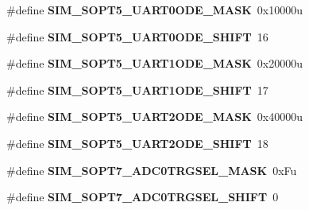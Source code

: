 \begin{DoxyCompactItemize}
\item 
\hypertarget{group___s_i_m___register___masks_ga85d9af0e8b110779992162a6820b5358}{}\#define {\bfseries S\+I\+M\+\_\+\+S\+O\+P\+T5\+\_\+\+U\+A\+R\+T0\+O\+D\+E\+\_\+\+M\+A\+S\+K}~0x10000u\label{group___s_i_m___register___masks_ga85d9af0e8b110779992162a6820b5358}

\item 
\hypertarget{group___s_i_m___register___masks_gaa972dcd4d7e6d7a72e9da197afd19f03}{}\#define {\bfseries S\+I\+M\+\_\+\+S\+O\+P\+T5\+\_\+\+U\+A\+R\+T0\+O\+D\+E\+\_\+\+S\+H\+I\+F\+T}~16\label{group___s_i_m___register___masks_gaa972dcd4d7e6d7a72e9da197afd19f03}

\item 
\hypertarget{group___s_i_m___register___masks_ga8b6934ad333eab03eb0884605ae53383}{}\#define {\bfseries S\+I\+M\+\_\+\+S\+O\+P\+T5\+\_\+\+U\+A\+R\+T1\+O\+D\+E\+\_\+\+M\+A\+S\+K}~0x20000u\label{group___s_i_m___register___masks_ga8b6934ad333eab03eb0884605ae53383}

\item 
\hypertarget{group___s_i_m___register___masks_gaefef8a191a226bed4aaa950f3ea66e3e}{}\#define {\bfseries S\+I\+M\+\_\+\+S\+O\+P\+T5\+\_\+\+U\+A\+R\+T1\+O\+D\+E\+\_\+\+S\+H\+I\+F\+T}~17\label{group___s_i_m___register___masks_gaefef8a191a226bed4aaa950f3ea66e3e}

\item 
\hypertarget{group___s_i_m___register___masks_ga2b5bbe588bc3ea2299deead3e18b3932}{}\#define {\bfseries S\+I\+M\+\_\+\+S\+O\+P\+T5\+\_\+\+U\+A\+R\+T2\+O\+D\+E\+\_\+\+M\+A\+S\+K}~0x40000u\label{group___s_i_m___register___masks_ga2b5bbe588bc3ea2299deead3e18b3932}

\item 
\hypertarget{group___s_i_m___register___masks_gad3283784bd7916c036b2299401fa7468}{}\#define {\bfseries S\+I\+M\+\_\+\+S\+O\+P\+T5\+\_\+\+U\+A\+R\+T2\+O\+D\+E\+\_\+\+S\+H\+I\+F\+T}~18\label{group___s_i_m___register___masks_gad3283784bd7916c036b2299401fa7468}

\item 
\hypertarget{group___s_i_m___register___masks_gaeda70babef834cacace2c775d62bb4ae}{}\#define {\bfseries S\+I\+M\+\_\+\+S\+O\+P\+T7\+\_\+\+A\+D\+C0\+T\+R\+G\+S\+E\+L\+\_\+\+M\+A\+S\+K}~0x\+Fu\label{group___s_i_m___register___masks_gaeda70babef834cacace2c775d62bb4ae}

\item 
\hypertarget{group___s_i_m___register___masks_ga914ced2a5cf4e7f37371d52d34d4a930}{}\#define {\bfseries S\+I\+M\+\_\+\+S\+O\+P\+T7\+\_\+\+A\+D\+C0\+T\+R\+G\+S\+E\+L\+\_\+\+S\+H\+I\+F\+T}~0\label{group___s_i_m___register___masks_ga914ced2a5cf4e7f37371d52d34d4a930}


\end{DoxyCompactItemize}
